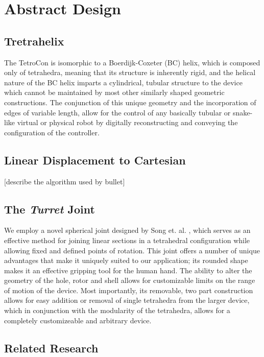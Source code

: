 \documentclass[11pt]{article}
\begin{document}
\section{Abstract Design}
\subsection{Tretrahelix}

The TetroCon is isomorphic to a Boerdijk-Coxeter (BC) helix, which is composed only of tetrahedra, meaning that its structure is inherently rigid, and the  helical nature of the BC helix imparts a cylindrical, tubular structure to the device which cannot be maintained by most other similarly shaped geometric constructions. The conjunction of this unique geometry and the incorporation of edges of variable length, allow for the control of any basically tubular or snake-like virtual or physical robot by digitally reconstructing and conveying the configuration of the controller.

\subsection{Linear Displacement to Cartesian}

[describe the algorithm used by bullet]
           
\subsection{The \textit{Turret} Joint}

We employ a novel spherical joint designed by Song et. al. \cite{song2003spherical}, which serves as an effective method for joining linear sections in a tetrahedral configuration while allowing fixed and defined points of rotation. This joint offers a number of unique advantages that make it uniquely suited to our application; its rounded shape makes it an effective gripping tool for the human hand. The ability to alter the geometry of the hole, rotor and shell allows for customizable limits on the range of motion of the device. Most importantly, its removable, two part construction allows for easy addition or removal of single tetrahedra from the larger device, which in conjunction with the modularity of the tetrahedra, allows for a completely customizeable and arbitrary device.
\subsection{Related Research}
\end{document}
